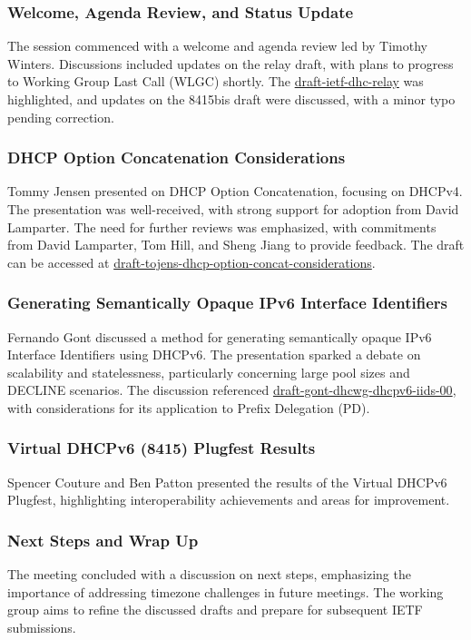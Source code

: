 \documentclass{article}
\begin{document}
\subsubsection{Welcome, Agenda Review, and Status Update}
The session commenced with a welcome and agenda review led by Timothy Winters. Discussions included updates on the relay draft, with plans to progress to Working Group Last Call (WLGC) shortly. The \href{https://datatracker.ietf.org/doc/html/draft-ietf-dhc-relay}{draft-ietf-dhc-relay} was highlighted, and updates on the 8415bis draft were discussed, with a minor typo pending correction.

\subsubsection{DHCP Option Concatenation Considerations}
Tommy Jensen presented on DHCP Option Concatenation, focusing on DHCPv4. The presentation was well-received, with strong support for adoption from David Lamparter. The need for further reviews was emphasized, with commitments from David Lamparter, Tom Hill, and Sheng Jiang to provide feedback. The draft can be accessed at \href{https://datatracker.ietf.org/doc/draft-tojens-dhcp-option-concat-considerations/}{draft-tojens-dhcp-option-concat-considerations}.

\subsubsection{Generating Semantically Opaque IPv6 Interface Identifiers}
Fernando Gont discussed a method for generating semantically opaque IPv6 Interface Identifiers using DHCPv6. The presentation sparked a debate on scalability and statelessness, particularly concerning large pool sizes and DECLINE scenarios. The discussion referenced \href{https://datatracker.ietf.org/doc/draft-gont-dhcwg-dhcpv6-iids-00/}{draft-gont-dhcwg-dhcpv6-iids-00}, with considerations for its application to Prefix Delegation (PD).

\subsubsection{Virtual DHCPv6 (8415) Plugfest Results}
Spencer Couture and Ben Patton presented the results of the Virtual DHCPv6 Plugfest, highlighting interoperability achievements and areas for improvement.

\subsubsection{Next Steps and Wrap Up}
The meeting concluded with a discussion on next steps, emphasizing the importance of addressing timezone challenges in future meetings. The working group aims to refine the discussed drafts and prepare for subsequent IETF submissions.
\end{document}
